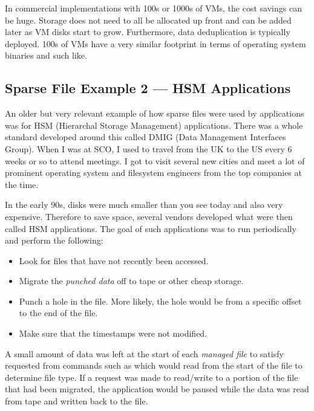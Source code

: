 In commercial implementations with 100s or 1000s of VMs, the cost savings can be huge. Storage does not need to all be allocated up front and can be added later as VM disks start to grow. Furthermore, data deduplication is typically deployed. 100s of VMs have a very similar footprint in terms of operating system binaries and such like.


\subsection{Sparse File Example 2 --- HSM Applications}

An older but very relevant example of how sparse files were used by applications was for HSM (Hierarchal Storage Management) applications. There was a whole standard developed around this called DMIG (Data Management Interfaces Group). When I was at SCO, I used to travel from the UK to the US every 6 weeks or so to attend meetings. I got to visit several new cities and meet a lot of prominent operating system and filesystem engineers from the top companies at the time.

In the early 90s, disks were much smaller than you see today and also very expensive. Therefore to save space, several vendors developed what were then called HSM applications. The goal of such applications was to run periodically and perform the following:

\begin{itemize}
	\item Look for files that have not recently been accessed.
	\item Migrate the \textit{punched data} off to tape or other cheap storage.
	\item Punch a hole in the file. More likely, the hole would be from a specific offset to the end of the file.
	\item Make sure that the timestamps were not modified.
\end{itemize}

\noindent
A small amount of data was left at the start of each \textit{managed file} to satisfy requested from commands such as  which would read from the start of the file to determine file type. If a request was made to read/write to a portion of the file that had been migrated, the application would be paused while the data was read from tape and written back to the file.

